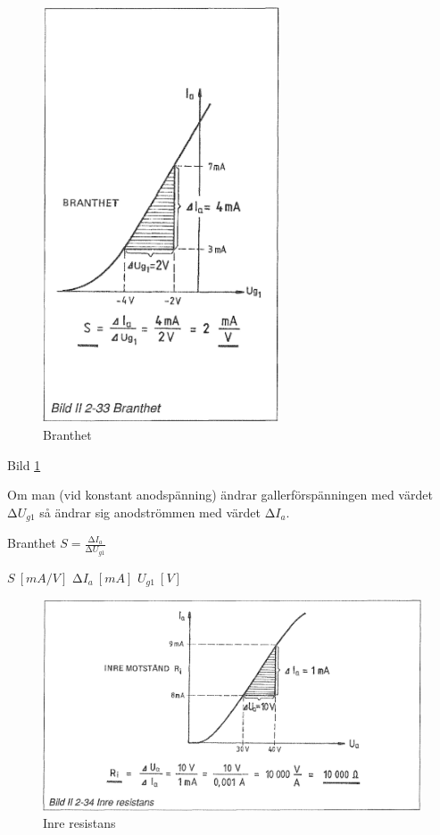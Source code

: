\begin{figure}[h]
\begin{center}
\includegraphics[width=7cm]{images/bild_2_2-33}
\caption{Branthet}
\label{fig:BildII2-33}
\end{center}
\end{figure}

Bild \ref{fig:BildII2-33}

Om man (vid konstant anodspänning) ändrar gallerförspänningen med värdet
\(∆U_{g1}\) så ändrar sig anodströmmen med värdet \(∆I_a\).

Branthet \(S = \frac{∆I_a}{∆U_{g1}}\)

\(S\ [mA/V]\) \(∆I_a\ [mA]\) \(U_{g1}\ [V]\)

\begin{figure}[h]
\begin{center}
\includegraphics[width=14cm]{images/bild_2_2-34}
\caption{Inre resistans}
\label{fig:BildII2-34}
\end{center}
\end{figure}

